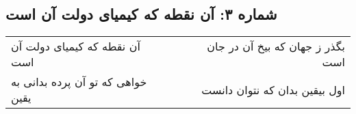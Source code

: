 \begin{center}
\section*{شماره ۳: آن نقطه که کیمیای دولت آن است}
\label{sec:003}
\begin{longtable}{l p{0.5cm} r}
آن نقطه که کیمیای دولت آن است
&&
بگذر ز جهان که بیخ آن در جان است
\\
خواهی که تو آن پرده بدانی به یقین
&&
اول بیقین بدان که نتوان دانست
\\
\end{longtable}
\end{center}
